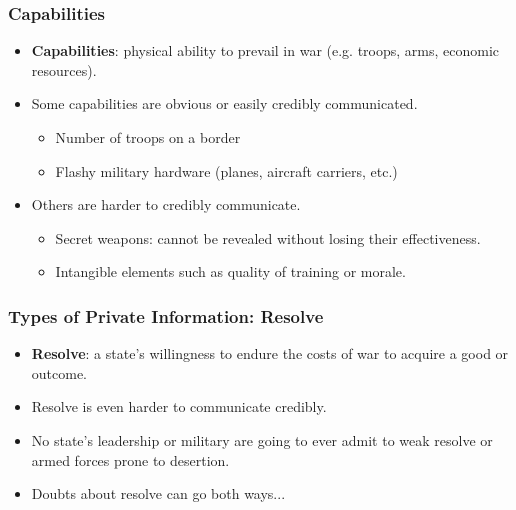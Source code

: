 \documentclass{beamer}
\begin{document}
\begin{frame} 
	\frametitle{\LARGE{Capabilities}}
	\begin{itemize}
		\item \textbf{Capabilities}: physical ability to prevail in war (e.g. troops, arms, economic resources). \pause
		\item Some capabilities are obvious or easily credibly communicated. \pause
		\begin{itemize}
			\item Number of troops on a border \pause
			\item Flashy military hardware (planes, aircraft carriers, etc.) \pause
		\end{itemize}
		\item Others are harder to credibly communicate. \pause
			\begin{itemize}
			\item Secret weapons: cannot be revealed without losing their effectiveness. \pause
			\item Intangible elements such as quality of training or morale.
		\end{itemize}
	\end{itemize}
\end{frame}

\begin{frame} 
	\frametitle{\LARGE{Types of Private Information: Resolve}}
	\begin{itemize}
		\item \textbf{Resolve}: a state's willingness to endure the costs of war to acquire a good or outcome. \pause 
		\item Resolve is even harder to communicate credibly. \pause
		\item No state's leadership or military are going to ever admit to weak resolve or armed forces prone to desertion. \pause
		\item Doubts about resolve can go both ways...
	\end{itemize}
\end{frame}
\end{document}
